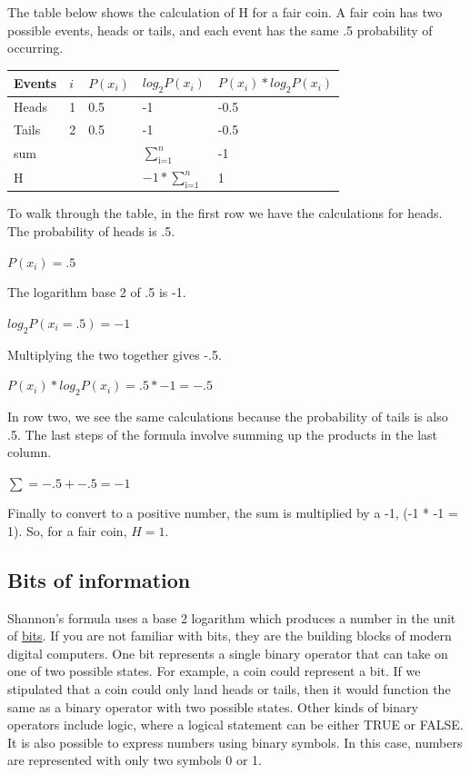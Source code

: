 \documentclass[
  oneside,
  12pt]{crumpbook}
\begin{document}
The table below shows the calculation of H for a fair coin. A fair coin has two possible events, heads or tails, and each event has the same .5 probability of occurring.

\begin{tabular}{l|l|l|l|l}
\hline
Events & $i$ & $P(x_i)$ & $log_2 P(x_i)$ & $P(x_i)*log_2 P(x_i)$\\
\hline
Heads & 1 & 0.5 & -1 & -0.5\\
\hline
Tails & 2 & 0.5 & -1 & -0.5\\
\hline
sum &  &  & $\sum_\text{i=1}^n$ & -1\\
\hline
H &  &  & $-1*\sum_\text{i=1}^n$ & 1\\
\hline
\end{tabular}

To walk through the table, in the first row we have the calculations for heads. The probability of heads is .5.

\(P(x_i) = .5\)

The logarithm base 2 of .5 is -1.

\(log_2 P(x_i = .5) = -1\)

Multiplying the two together gives -.5.

\(P(x_i)*log_2 P(x_i) = .5 * -1 = -.5\)

In row two, we see the same calculations because the probability of tails is also .5. The last steps of the formula involve summing up the products in the last column.

\(\sum=-.5 + -.5 = -1\)

Finally to convert to a positive number, the sum is multiplied by a -1, (-1 * -1 = 1). So, for a fair coin, \(H = 1\).

\hypertarget{bits-of-information}{%
\subsection{Bits of information}\label{bits-of-information}}

Shannon's formula uses a base 2 logarithm which produces a number in the unit of \href{https://en.wikipedia.org/wiki/Bit}{bits}. If you are not familiar with bits, they are the building blocks of modern digital computers. One bit represents a single binary operator that can take on one of two possible states. For example, a coin could represent a bit. If we stipulated that a coin could only land heads or tails, then it would function the same as a binary operator with two possible states. Other kinds of binary operators include logic, where a logical statement can be either TRUE or FALSE. It is also possible to express numbers using binary symbols. In this case, numbers are represented with only two symbols 0 or 1.
\end{document}
